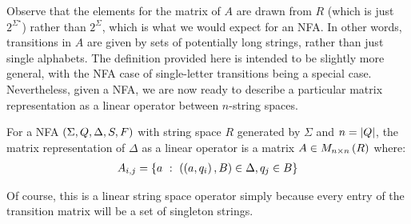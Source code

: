 Observe that the elements for the matrix of \(A\) are drawn from
\(R\) (which is just \(2^{\Sigma^\star}\))
rather than \(2^{\Sigma}\),
which is what we would expect for an NFA.
In other words, transitions in \(A\) are given by sets of potentially
long strings, rather than just single alphabets.
The definition provided here is intended to be slightly more general,
with the NFA case of single-letter transitions being a special case.
Nevertheless,
given a NFA, we are now ready to describe a particular matrix representation
as a linear operator between \(n\)-string spaces.

\begin{definition}
  For a NFA \(\left(\Sigma, Q, \Delta, S, F\right)\) with
  string space \(R\) generated by \(\Sigma\) and \(n = \left\lvert Q\right\rvert\),
  the matrix representation of \(\Delta\) as a linear operator
  is a matrix
  \(A \in M_{n \times n} \left(R\right)\)  where:
  \begin{align*}
    A_{i, j}
      = \left\{a \  : \  \left(\left(a, q_i\right), B\right) \in \Delta, q_j \in B\right\}
  \end{align*}
\end{definition}

Of course, this is a linear string space operator simply because
every entry of the transition matrix will be a set of singleton strings.




